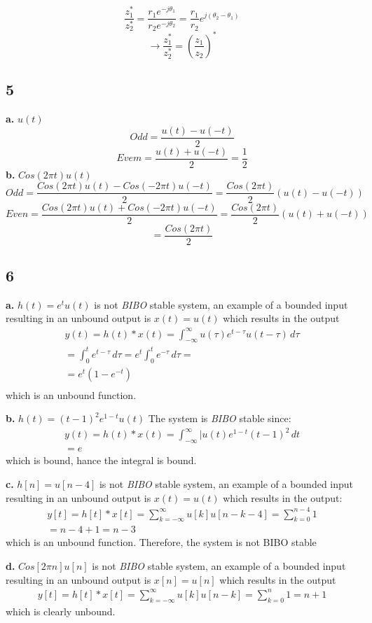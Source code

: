 \documentclass[10pt, letterpaper]{article}
\begin{document}
\[
\frac{z_1^*}{z_2^*} =
\frac{r_1 e^{-j\theta_1}}{r_2 e^{-j\theta_2}} = 
\frac{r_1}{r_2} e^{j(\theta_2 - \theta_1)}
\]
\[
\rightarrow
\frac{z_1^*}{z_2^*} =(\frac{z_1}{z_2})^* 
\]

\subsection*{5}
\textbf{a.} $u(t)$
\[ Odd = \frac{u(t) - u(-t)}{2}\]
\[Evem = \frac{u(t) + u(-t)}{2} =  \frac{1}{2}\]
\textbf{b.} $Cos(2\pi t)u(t)$
\[Odd = \frac{Cos(2\pi t)u(t) - Cos(-2\pi t)u(-t)}{2} = \frac{Cos(2\pi t)}{2}(u(t) - u(-t))\]
\[Even = \frac{Cos(2\pi t)u(t) + Cos(-2\pi t)u(-t)}{2} = \frac{Cos(2\pi t)}{2}(u(t) + u(-t))\]
\[ = \frac{Cos(2\pi t)}{2}\]


\subsection*{6}
\textbf{a.} $h(t) = e^tu(t)$ is not \emph{BIBO} stable system, an example of a bounded input 
resulting in an unbound output is $x(t) = u(t)$ which results in the output
\begin{align*}
y(t) = h(t) * x(t) = 
\int_{-\infty}^{\infty} u(\tau)e^{t - \tau}u(t - \tau) \, d\tau \\
= \int_{0}^{t}e^{t - \tau} \, d\tau 
= e^t \int_{0}^{t}e^{-\tau} \, d\tau = \\
= \boxed{e^t (1 - e^{-t})}
\\
\end{align*}
which is an unbound function.

\textbf{b.} $h(t) = (t - 1)^2e^{1-t}u(t)$ The system is \emph{BIBO} stable since:
\begin{align*}
	y(t) = h(t) * x(t) = 
	\int_{-\infty}^{\infty} |u(t)e^{1 - t}(t - 1)^2 \, dt \\
	= e
\end{align*}
which is bound, hance the integral is bound.

\textbf{c.} $h[n] = u[n - 4]$ is not \emph{BIBO} stable system, an example of a bounded input 
resulting in an unbound output is $x(t) = u(t)$ which results in the output:
\begin{align*}
y[t] = h[t] * x[t] = 
\sum_{k = -\infty}^{\infty} u[k] u[n - k - 4] = \sum_{k = 0}^{n - 4} 1 \\
= n - 4 + 1 = \boxed{n - 3}
\end{align*}
which is an unbound function. Therefore, the system is not BIBO stable

\textbf{d.} $Cos[2\pi n] u[n]$ is not \emph{BIBO} stable system, an example of a bounded input 
resulting in an unbound output is $x[n]= u[n]$ which results in the output
\begin{align*}
y[t] = h[t] * x[t] = 
\sum_{k = -\infty}^{\infty} u[k] u[n - k] 
= \sum_{k = 0}^{n} 1 
= \boxed{n +1 }
\end{align*}
which is clearly unbound.
\end{document}
